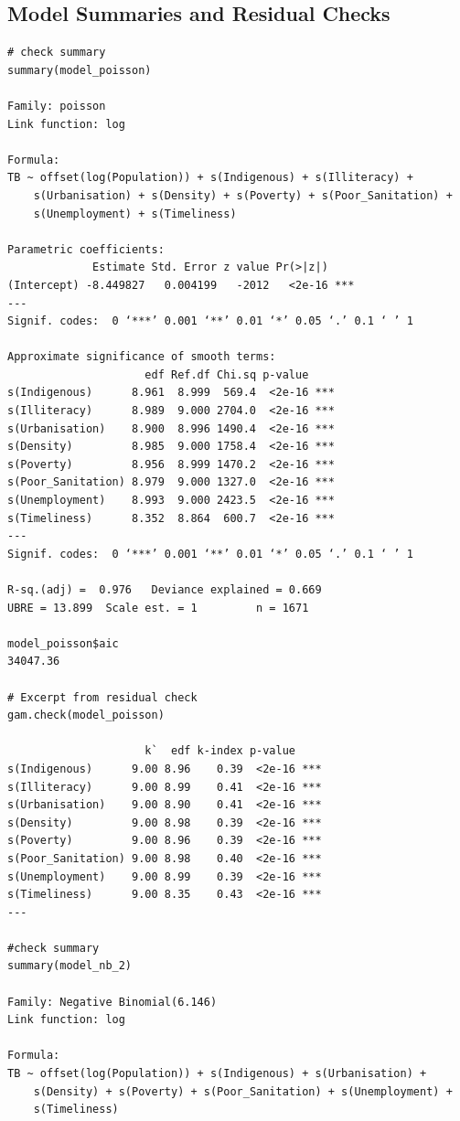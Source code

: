 \subsection{Model Summaries and Residual Checks}
\begin{verbatim}
# check summary
summary(model_poisson)

Family: poisson 
Link function: log 

Formula:
TB ~ offset(log(Population)) + s(Indigenous) + s(Illiteracy) + 
    s(Urbanisation) + s(Density) + s(Poverty) + s(Poor_Sanitation) + 
    s(Unemployment) + s(Timeliness)

Parametric coefficients:
             Estimate Std. Error z value Pr(>|z|)    
(Intercept) -8.449827   0.004199   -2012   <2e-16 ***
---
Signif. codes:  0 ‘***’ 0.001 ‘**’ 0.01 ‘*’ 0.05 ‘.’ 0.1 ‘ ’ 1

Approximate significance of smooth terms:
                     edf Ref.df Chi.sq p-value    
s(Indigenous)      8.961  8.999  569.4  <2e-16 ***
s(Illiteracy)      8.989  9.000 2704.0  <2e-16 ***
s(Urbanisation)    8.900  8.996 1490.4  <2e-16 ***
s(Density)         8.985  9.000 1758.4  <2e-16 ***
s(Poverty)         8.956  8.999 1470.2  <2e-16 ***
s(Poor_Sanitation) 8.979  9.000 1327.0  <2e-16 ***
s(Unemployment)    8.993  9.000 2423.5  <2e-16 ***
s(Timeliness)      8.352  8.864  600.7  <2e-16 ***
---
Signif. codes:  0 ‘***’ 0.001 ‘**’ 0.01 ‘*’ 0.05 ‘.’ 0.1 ‘ ’ 1

R-sq.(adj) =  0.976   Deviance explained = 0.669
UBRE = 13.899  Scale est. = 1         n = 1671

model_poisson$aic
34047.36

# Excerpt from residual check
gam.check(model_poisson)

                     k`  edf k-index p-value    
s(Indigenous)      9.00 8.96    0.39  <2e-16 ***
s(Illiteracy)      9.00 8.99    0.41  <2e-16 ***
s(Urbanisation)    9.00 8.90    0.41  <2e-16 ***
s(Density)         9.00 8.98    0.39  <2e-16 ***
s(Poverty)         9.00 8.96    0.39  <2e-16 ***
s(Poor_Sanitation) 9.00 8.98    0.40  <2e-16 ***
s(Unemployment)    9.00 8.99    0.39  <2e-16 ***
s(Timeliness)      9.00 8.35    0.43  <2e-16 ***
---

#check summary
summary(model_nb_2)

Family: Negative Binomial(6.146) 
Link function: log 

Formula:
TB ~ offset(log(Population)) + s(Indigenous) + s(Urbanisation) + 
    s(Density) + s(Poverty) + s(Poor_Sanitation) + s(Unemployment) + 
    s(Timeliness)


\end{verbatim}
